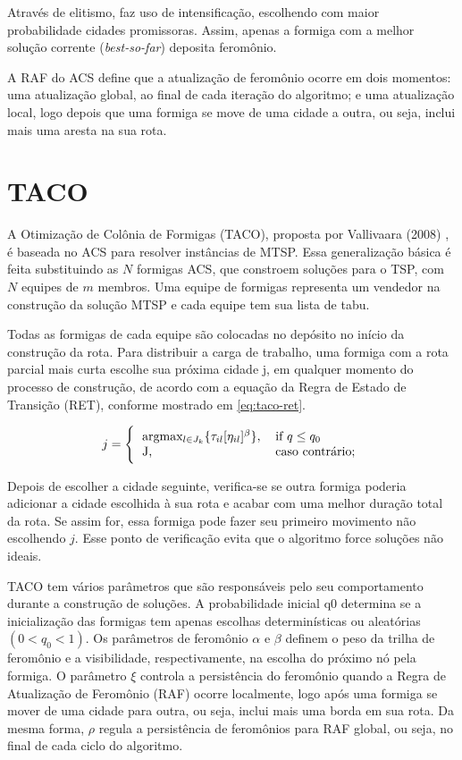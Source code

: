 Através de elitismo, faz uso de intensificação, escolhendo com maior probabilidade cidades promissoras. Assim, apenas a formiga com a melhor solução corrente (\textit{best-so-far}) deposita feromônio.

A RAF do ACS define que a atualização de feromônio ocorre em dois momentos: uma atualização global, ao final de cada iteração do algoritmo; e uma atualização local, logo depois que uma formiga se move de uma cidade a outra, ou seja, inclui mais uma aresta na sua rota.

\section{TACO}
\label{sec-taco}

A Otimização de Colônia de Formigas (TACO), proposta por Vallivaara (2008) \cite{vallivaara2008team}, é baseada no ACS para resolver instâncias de MTSP. Essa generalização básica é feita substituindo as $N$ formigas ACS, que constroem soluções para o TSP, com $N$ equipes de $m$ membros. Uma equipe de formigas representa um vendedor na construção da solução MTSP e cada equipe tem sua lista de tabu.

Todas as formigas de cada equipe são colocadas no depósito no início da construção da rota. Para distribuir a carga de trabalho, uma formiga com a rota parcial mais curta escolhe sua próxima cidade j, em qualquer momento do processo de construção, de acordo com a equação da Regra de Estado de Transição (RET), conforme mostrado em \ref{eq:taco-ret}.

\begin{equation} \label{eq:taco-ret} 
    j = \Bigg\{
        \begin{tabular}{ll}
        argmax\(_{l \in J_k} \{\tau_{il}[\eta_{il}]^\beta\}\), & if $q \leq q_0$ \\
        J, & caso contrário;
        \end{tabular}
\end{equation}

Depois de escolher a cidade seguinte, verifica-se se outra formiga poderia adicionar a cidade escolhida à sua rota e acabar com uma melhor duração total da rota. Se assim for, essa formiga pode fazer seu primeiro movimento não escolhendo $j$. Esse ponto de verificação evita que o algoritmo force soluções não ideais.

TACO tem vários parâmetros que são responsáveis pelo seu comportamento durante a construção de soluções. A probabilidade inicial q0 determina se a inicialização das formigas tem apenas escolhas determinísticas ou aleatórias $(0 < q_0 <1)$. Os parâmetros de feromônio $\alpha$ e $\beta$ definem o peso da trilha de feromônio e a visibilidade, respectivamente, na escolha do próximo nó pela formiga. O parâmetro $\xi$ controla a persistência do feromônio quando a Regra de Atualização de Feromônio (RAF) ocorre localmente, logo após uma formiga se mover de uma cidade para outra, ou seja, inclui mais uma borda em sua rota. Da mesma forma, $\rho$ regula a persistência de feromônios para RAF global, ou seja, no final de cada ciclo do algoritmo.

